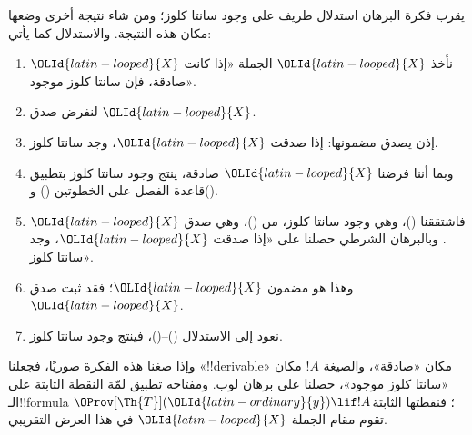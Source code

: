 \documentclass[../../../include/open-logic-section]{subfiles}
\begin{document}
\begin{explain}
يقرب فكرة البرهان استدلال طريف على وجود سانتا كلوز؛ ومن شاء
نتيجة أخرى وضعها مكان هذه النتيجة. والاستدلال كما يأتي:
\begin{enumerate}
\item نأخذ $\OLId{latin-looped}{X}$ الجملة «إذا كانت $\OLId{latin-looped}{X}$ صادقة، فإن سانتا كلوز موجود».
\item لنفرض صدق $\OLId{latin-looped}{X}$.
\item إذن يصدق مضمونها: إذا صدقت $\OLId{latin-looped}{X}$، وجد سانتا كلوز.
\item وبما أننا فرضنا $\OLId{latin-looped}{X}$ صادقة، ينتج وجود سانتا كلوز بتطبيق
  قاعدة الفصل على الخطوتين () و().
\item فاشتققنا ()، وهي وجود سانتا كلوز، من ()، وهي صدق $\OLId{latin-looped}{X}$.
  وبالبرهان الشرطي حصلنا على «إذا صدقت $\OLId{latin-looped}{X}$، وجد سانتا كلوز».
\item وهذا هو مضمون $\OLId{latin-looped}{X}$؛ فقد ثبت صدق $\OLId{latin-looped}{X}$.
\item نعود إلى الاستدلال ()--()، فينتج وجود سانتا كلوز.
\end{enumerate}
وإذا صغنا هذه الفكرة صوريًا، فجعلنا «!!{derivable}» مكان
«صادقة»، والصيغة $!A$ مكان «سانتا كلوز موجود»، حصلنا على برهان
لوب. ومفتاحه تطبيق لمّة النقطة الثابتة على الـ!!{formula}
$\OProv[\Th{T}](\OLId{latin-ordinary}{y}) \lif !A$؛ فنقطتها الثابتة تقوم مقام
الجملة $\OLId{latin-looped}{X}$ في هذا العرض التقريبي.
\end{explain}
\end{document}
